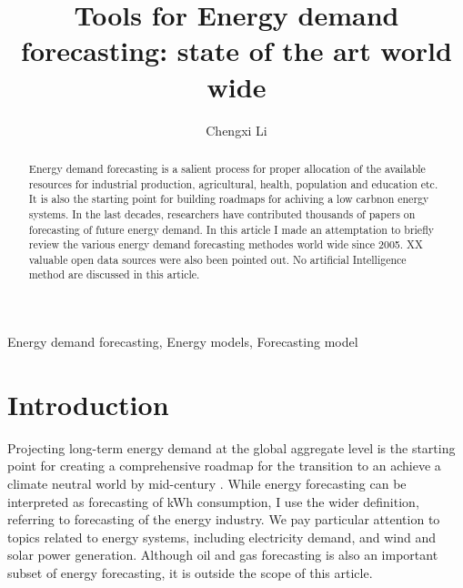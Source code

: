 \documentclass[lettersize,journal]{IEEEtran}
\begin{document}
\title{Tools for Energy demand forecasting: state of the art world wide}
\author{Chengxi Li}


\maketitle

\begin{abstract}
  Energy demand forecasting is a salient process for proper allocation of the available resources for industrial production, agricultural, health, population and education etc. It is also the starting point for building roadmaps for achiving a low carbnon energy systems. In the last decades, researchers have contributed thousands of papers on forecasting of future energy demand.
  In this article I made an attemptation to briefly review the various energy demand forecasting methodes world wide since 2005. XX valuable open data sources were also been pointed out. No artificial Intelligence method are discussed in this article.
  
\end{abstract}

\begin{IEEEkeywords}
Energy demand forecasting, Energy models, Forecasting model
\end{IEEEkeywords}


\section{Introduction}

Projecting long-term energy demand at the global aggregate level is the starting point for creating a comprehensive roadmap for the transition to an achieve a climate neutral world by mid-century \cite{UNFCCC}. While energy forecasting can be interpreted as forecasting of kWh consumption, I use the wider definition, referring to forecasting of the energy industry. We pay particular attention to topics related to energy systems, including electricity demand, and wind and solar power generation. Although oil and gas forecasting is also an important subset of energy forecasting, it is outside the scope of this article.
\end{document}
